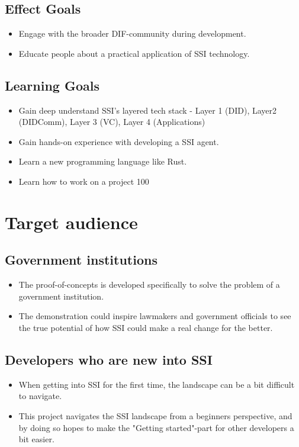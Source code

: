 \subsection{Effect Goals}

\begin{itemize}
\item Engage with the broader DIF-community during development.
\item Educate people about a practical application of SSI technology.
\end{itemize}

\subsection{Learning Goals}

\begin{itemize}
\item Gain deep understand SSI's layered tech stack - Layer 1 (DID), Layer2 (DIDComm), Layer 3 (VC), Layer 4 (Applications)
\item Gain hands-on experience with developing a SSI agent.
\item Learn a new programming language like Rust.
\item Learn how to work on a project 100%
\end{itemize}





\section{Target audience}

\subsection{Government institutions}

\begin{itemize}
\item The proof-of-concepts is developed specifically to solve the problem of a government institution.
\item The demonstration could inspire lawmakers and government officials to see the true potential of how SSI could make a real change for the better.
\end{itemize}

\subsection{Developers who are new into SSI}
\begin{itemize}
\item When getting into SSI for the first time, the landscape can be a bit difficult to navigate.
\item This project navigates the SSI landscape from a beginners perspective, and by doing so hopes to make the "Getting started"-part for other developers a bit easier.
\end{itemize}

